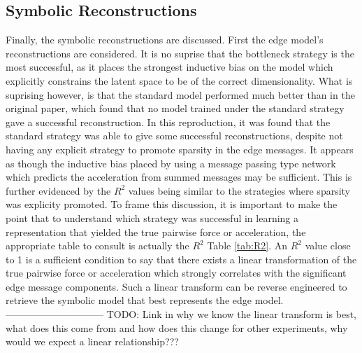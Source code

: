 \documentclass[11pt]{article}
\begin{document}
\subsection{Symbolic Reconstructions}

Finally, the symbolic reconstructions are discussed. First the edge model's reconstructions are considered. It is no suprise that the bottleneck strategy is the most successful, as it places the strongest inductive bias on the model which explicitly constrains the latent space to be of the correct dimensionality. What is suprising however, is that the standard model performed much better than in the original paper, which found that no model trained under the standard strategy gave a successful reconstruction. In this reproduction, it was found that the standard strategy was able to give some successful reconstructions, despite not having any explicit strategy to promote sparsity in the edge messages. It appears as though the inductive bias placed by using a message passing type network which predicts the acceleration from summed messages may be sufficient. This is further evidenced by the $R^2$ values being similar to the strategies where sparsity was explicity promoted.
To frame this discussion, it is important to make the point that to understand which strategy was successful in learning a representation that yielded the true pairwise force or acceleration, the appropriate table to consult is actually the $R^2$ Table \ref{tab:R2}. An $R^2$ value close to 1 is a sufficient condition to say that there exists a linear transformation of the true pairwise force or acceleration which strongly correlates with the significant edge message components. Such a linear transform can be reverse engineered to retrieve the symbolic model that best represents the edge model. 
------------------------------
TODO: Link in why we know the linear transform is best, what does this come from and how does this change for other experiments, why would we expect a linear relationship???
\end{document}
